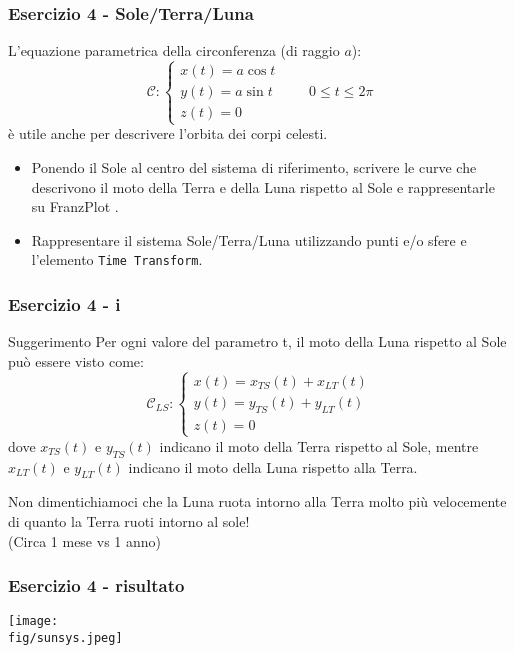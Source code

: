 \documentclass{beamer}
\newcommand{\fig}{figures} %
\newcommand{\frnzplt}{FranzPlot }
\begin{document}
\begin{frame}
	\frametitle{Esercizio 4 - Sole/Terra/Luna}
	L'equazione parametrica della circonferenza (di raggio $a$):
	\begin{displaymath}
	\mathcal{C}:\begin{cases}
	x(t)= a \cos t\\
	y(t)= a \sin t\\
	z(t)= 0
	\end{cases}
	\qquad 0 \leq t \leq 2 \pi
	\end{displaymath}
	\`e utile anche per descrivere l'orbita dei corpi celesti.
	\begin{itemize}
		\item Ponendo il Sole al centro del sistema di riferimento, scrivere le curve che descrivono il moto della Terra e della Luna rispetto al Sole e rappresentarle su \frnzplt.
		\item Rappresentare il sistema Sole/Terra/Luna utilizzando punti e/o sfere e l'elemento \texttt{Time Transform}.
	\end{itemize}
\end{frame}

\begin{frame}
	\frametitle{Esercizio 4 - i}
	\begin{block}{Suggerimento}
		Per ogni valore del parametro t, il moto della Luna rispetto al Sole pu\`o essere visto come:
		\begin{displaymath}
		\mathcal{C}_{LS}:\begin{cases}
		x(t)= x_{TS}(t) + x_{LT}(t) \\
		y(t)= y_{TS}(t) + y_{LT}(t)\\
		z(t)= 0
		\end{cases}
		\end{displaymath}
		dove $x_{TS}(t)$ e $y_{TS}(t)$ indicano il moto della Terra rispetto al Sole, mentre 
		$x_{LT}(t)$ e $y_{LT}(t)$ indicano il moto della Luna rispetto alla Terra.

                Non dimentichiamoci che la Luna ruota intorno alla Terra molto pi\`u velocemente di quanto la Terra ruoti intorno al sole!\\
                (Circa 1 mese vs 1 anno)
	\end{block}
\end{frame}

\begin{frame}
\frametitle{Esercizio 4 - risultato}
\texttt{[image: \\fig/sunsys.jpeg]}
\end{frame}
\end{document}
